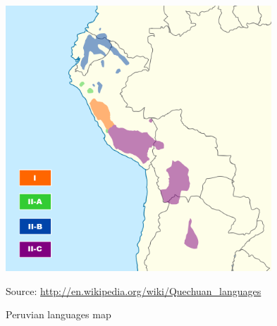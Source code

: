 \begin{figure}[!ht]

\includegraphics[width=0.889\textwidth]{figures/yqgi03}

\caption{Peruvian languages map}\label{Figsim}
\raggedright
{\scriptsize Source: \url{http://en.wikipedia.org/wiki/Quechuan_languages}}
\end{figure}

